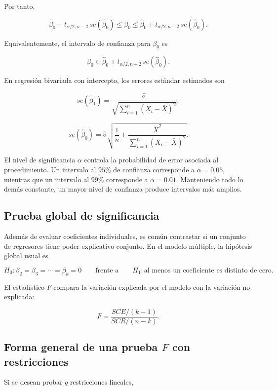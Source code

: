 \documentclass[11pt,a4paper]{article}
\begin{document}
Por tanto,

\begin{resultado}
\[
\boxed{
\hat{\beta}_0-t_{\alpha/2,n-2}\,se(\hat{\beta}_0)
\leq \beta_0 \leq
\hat{\beta}_0+t_{\alpha/2,n-2}\,se(\hat{\beta}_0)
}.
\]
\end{resultado}

Equivalentemente, el intervalo de confianza para \(\beta_0\) es

\[
\boxed{\beta_0\in \hat{\beta}_0\pm t_{\alpha/2,n-2}\,se(\hat{\beta}_0)}.
\]

En regresión bivariada con intercepto, los errores estándar estimados son

\[
se(\hat{\beta}_1)=\frac{\hat{\sigma}}{\sqrt{\sum_{i=1}^{n}(X_i-\bar{X})^2}},
\]

\[
se(\hat{\beta}_0)=\hat{\sigma}\sqrt{\frac{1}{n}+\frac{\bar{X}^2}{\sum_{i=1}^{n}(X_i-\bar{X})^2}}.
\]

\begin{observacion}
El nivel de significancia \(\alpha\) controla la probabilidad de error asociada al procedimiento. Un intervalo al \(95\%\) de confianza corresponde a \(\alpha=0.05\), mientras que un intervalo al \(99\%\) corresponde a \(\alpha=0.01\). Manteniendo todo lo demás constante, un mayor nivel de confianza produce intervalos más amplios.
\end{observacion}

\subsection{Prueba global de significancia}

Además de evaluar coeficientes individuales, es común contrastar si un conjunto de regresores tiene poder explicativo conjunto. En el modelo múltiple, la hipótesis global usual es

\[
H_0:\beta_2=\beta_3=\cdots=\beta_k=0
\qquad \text{frente a} \qquad
H_1:\text{al menos un coeficiente es distinto de cero}.
\]

El estadístico \(F\) compara la variación explicada por el modelo con la variación no explicada:

\[
F=\frac{SCE/(k-1)}{SCR/(n-k)}.
\]

\subsection*{Forma general de una prueba \(F\) con restricciones}

Si se desean probar \(q\) restricciones lineales,
\end{document}
